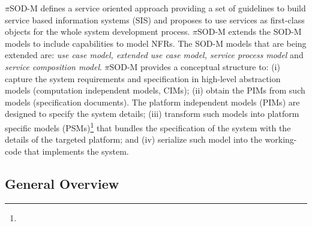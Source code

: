 

$\pi$SOD-M defines a service oriented approach providing a set of guidelines to
build service based information systems (SIS) and proposes to use services as
first-class objects for the whole system development process. $\pi$SOD-M extends
the SOD-M models to include capabilities to model NFRs. The
SOD-M models that are being extended are: \textit{use case model, extended use case model, service
process model} and \textit{service composition model}. $\pi$SOD-M
provides a conceptual structure to: (i) capture the system requirements and specification in
high-level abstraction models (computation independent models, CIMs); (ii)
obtain the PIMs from such models (specification documents). The
platform independent models (PIMs) are designed to specify the system
details; (iii) transform such models into platform specific models
(PSMs)\footnote{} that bundles the
specification of the system with the details of the targeted platform; and (iv) serialize such model into the working-code that implements the system.




\subsection{General Overview}

